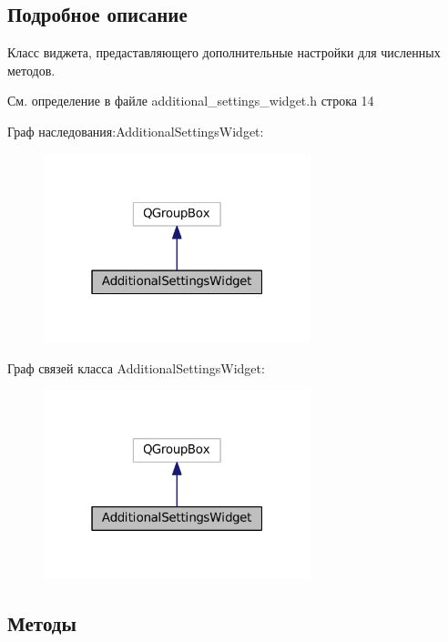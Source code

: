 \subsection{Подробное описание}
Класс виджета, предаставляющего дополнительные настройки для численных методов. 

См. определение в файле additional\+\_\+settings\+\_\+widget.\+h строка 14



Граф наследования\+:Additional\+Settings\+Widget\+:\nopagebreak
\begin{figure}[H]
\begin{center}
\leavevmode
\includegraphics[width=220pt]{class_additional_settings_widget__inherit__graph}
\end{center}
\end{figure}


Граф связей класса Additional\+Settings\+Widget\+:\nopagebreak
\begin{figure}[H]
\begin{center}
\leavevmode
\includegraphics[width=220pt]{class_additional_settings_widget__coll__graph}
\end{center}
\end{figure}


\subsection{Методы}
\hypertarget{class_additional_settings_widget_aaa678b544facc924f555b15e5640b21a}{}\label{class_additional_settings_widget_aaa678b544facc924f555b15e5640b21a} 
